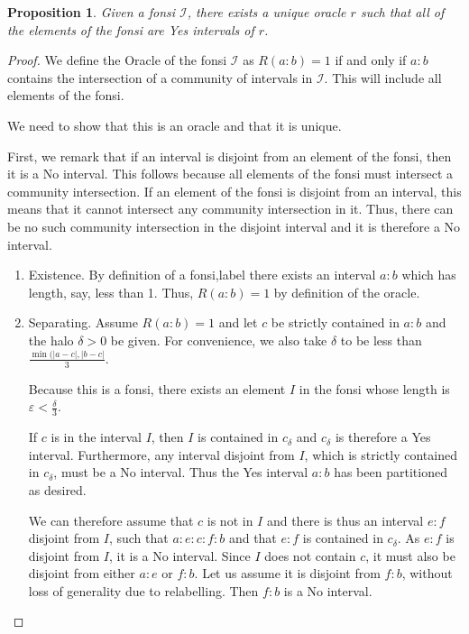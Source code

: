 \documentclass[12pt]{article}
\newtheorem{proposition}{Proposition}[subsection]
\begin{document}
\begin{proposition}\label{pr:fon-oracle-exists}
Given a fonsi $\mathcal{I}$, there exists a unique oracle $r$ such that all of the elements of the fonsi are Yes intervals of $r$.
\end{proposition}

\begin{proof}
We define the Oracle of the fonsi $\mathcal{I}$ as $R(a :b) = 1$ if and only if $a : b$ contains the intersection of a community of intervals in $\mathcal{I}$. This will include all elements of the fonsi.

We need to show that this is an oracle and that it is unique. 

First, we remark that if an interval is disjoint from an element of the fonsi, then it is a No interval. This follows because all elements of the fonsi must intersect a community intersection. If an element of the fonsi is disjoint from an interval, this means that it cannot intersect any community intersection in it. Thus, there can be no such community intersection in the disjoint interval and it is therefore a No interval.

\begin{enumerate}
    \item Existence. By definition of a fonsi,label there exists an interval $a:b$ which has length, say,  less than 1. Thus, $R(a:b)=1$ by definition of the oracle.
    
    \item Separating. Assume $R(a:b)=1$ and let $c$ be strictly contained in $a:b$ and the halo $\delta >0$ be given. For convenience, we also take $\delta$ to be less than $\frac{\min(|a-c|, |b-c|}{3}$.

    Because this is a fonsi, there exists an element $I$ in the fonsi whose length is $\varepsilon < \frac{\delta}{3}$. 
    
    If $c$ is in the interval $I$, then $I$ is contained in $c_\delta$ and $c_\delta$ is therefore a Yes interval. Furthermore, any interval disjoint from $I$, which is strictly contained in $c_\delta$, must be a No interval. Thus the Yes interval $a:b$ has been partitioned as desired. 

    We can therefore assume that $c$ is not in $I$ and there is thus an interval $e:f$ disjoint from $I$, such that $a:e:c:f:b$ and that $e:f$ is contained in $c_\delta$. As $e:f$ is disjoint from $I$, it is a No interval. Since $I$ does not contain $c$, it must also be disjoint from either $a:e$ or $f:b$. Let us assume it is disjoint from $f:b$, without loss of generality due to relabelling. Then $f:b$ is a No interval. 


\end{enumerate}
\end{proof}
\end{document}
